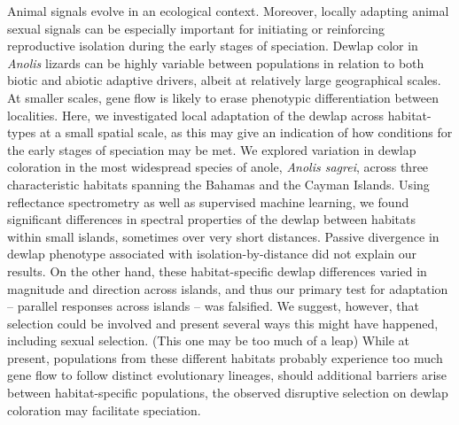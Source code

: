 Animal signals evolve in an ecological context. Moreover, locally adapting animal sexual signals can be especially important for initiating or reinforcing reproductive isolation during the early stages of speciation. Dewlap color in \textit{Anolis} lizards can be highly variable between populations in relation to both biotic and abiotic adaptive drivers, albeit at relatively large geographical scales. At smaller scales, gene flow is likely to erase phenotypic differentiation between localities. Here, we investigated local adaptation of the dewlap across habitat-types at a small spatial scale, as this may give an indication of how conditions for the early stages of speciation may be met. We explored variation in dewlap coloration in the most widespread species of anole, \textit{Anolis sagrei}, across three characteristic habitats spanning the Bahamas and the Cayman Islands. Using reflectance spectrometry as well as supervised machine learning, we found significant differences in spectral properties of the dewlap between habitats within small islands, sometimes over very short distances. Passive divergence in dewlap phenotype associated with isolation-by-distance did not explain our results. On the other hand, these habitat-specific dewlap differences varied in magnitude and direction across islands, and thus our primary test for adaptation -- parallel responses across islands -- was falsified. We suggest, however, that selection could be involved and present several ways this might have happened, including sexual selection. (This one may be too much of a leap) While at present, populations from these different habitats probably experience too much gene flow to follow distinct evolutionary lineages, should additional barriers arise between habitat-specific populations, the observed disruptive selection on dewlap coloration may facilitate speciation.


